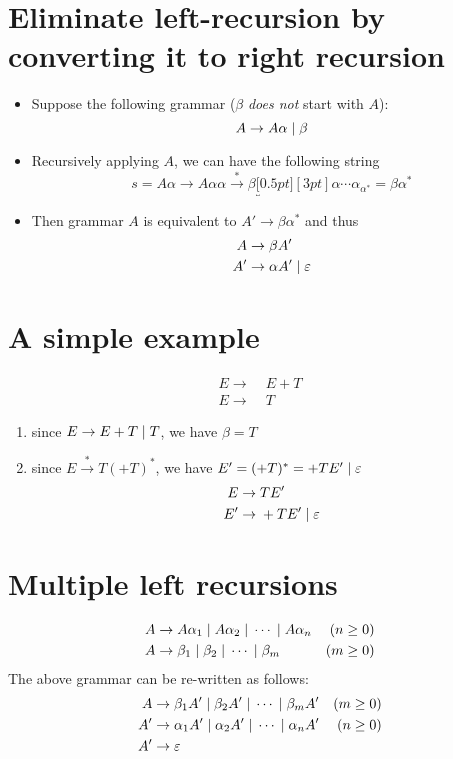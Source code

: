 \documentclass[10pt,a4paper,landscape]{article}
\begin{document}
\pagestyle{empty}

\begin{multicols*}{3}
\section*{Eliminate left-recursion by converting it to right recursion}
\begin{itemize}
\item Suppose the following grammar ($\beta$ \emph{does not} start with $A$):
  \[
A\to A\alpha \;|\; \beta
  \]
\item Recursively applying $A$, we can have the following string
  \[
s = A\alpha \to A\alpha\alpha \overset{*}{\to} \beta\underbracket[0.5pt][3pt]{\alpha\cdots\alpha}_{\alpha^{*}} = \beta\alpha^{*}
  \]
\item Then grammar $A$ is equivalent to $A' \to\beta\alpha^{*}$ and thus
  \begin{align*}
    A\to &\; \beta A' \\
    A'\to &\; \alpha A'\;|\; \varepsilon
  \end{align*}
\end{itemize}
\section*{A simple example}
\begin{align*}
  E\to &\; E + T \\
  E\to &\; T
\end{align*}
\begin{enumerate}
\item since $E\to E + T\;|\; T$, we have $\beta = T$
\item since $E \overset{*}{\to} T (+ T)^{*}$, we have $E' = (+ T)^{*} = + T E' \;|\; \varepsilon$
\begin{align*}
  E\to &\; T E' \\
  E'\to &\; + T E' \;|\; \varepsilon
\end{align*}
\end{enumerate}
\section*{Multiple left recursions}
\begin{align*}
  A\to &\; A\alpha_1\;|\; A\alpha_2 \;|\; \cdots \;|\; A\alpha_n & (n \geq 0)\\
  A\to &\; \beta_1\;|\;\beta_2\;|\;\cdots\;|\;\beta_m  & (m \geq 0)
\end{align*}
The above grammar can be re-written as follows:
\begin{align*}
  A\to &\; \beta_1 A'\;|\;\beta_2 A'\;|\;\cdots\;|\;\beta_m A'  & (m \geq 0) \\
  A'\to &\; \alpha_1 A'\;|\; \alpha_2 A' \;|\; \cdots \;|\; \alpha_n A' & (n \geq 0) \\
  A'\to &\; \varepsilon
\end{align*}

\end{multicols*}
\end{document}
